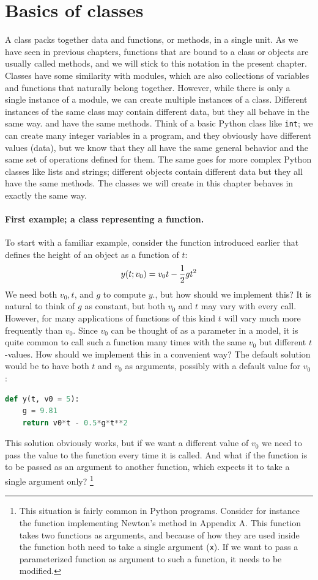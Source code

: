 \documentclass[graybox,envcountchap,sectrefs,final]{svmonodo}
\begin{document}
\section{Basics of classes}
A class packs together data and functions, or methods, in a single unit. As we have seen in previous chapters, functions
that are bound to a class or objects are usually called methods, and we will stick to this notation in the present chapter.
Classes have some similarity with modules, which are also collections of variables and functions that naturally
belong together. However, while there is only a single instance of a module, we can create multiple instances of a
class. Different instances of the same class may contain different data, but they all behave in the same way. and have the
same methods. Think of a basic Python class like \texttt{int}; we can create many integer variables in a program, and they
obviously have different values (data), but we know that they all have the same general behavior and the same
set of operations defined for them. The same goes for more complex Python classes like lists and strings; different
objects contain different data but they all have the same methods. The classes we will create in this chapter behaves
in exactly the same way.


\paragraph{First example; a class representing a function.}
To start with a familiar example, consider the function introduced earlier that defines the height of an object as a
function of $t$:
\[ y(t; v_0)=v_0t - {1\over2}gt^2\]
We need both $v_0, t$, and $g$ to compute $y$., but
how should we implement this? It is natural to think of $g$ as constant, but both $v_0$ and $t$ may vary with every call.
However, for many applications of functions of this kind $t$ will vary much more frequently than $v_0$. Since $v_0$
can be thought of as a parameter in a model, it is quite common to call such a function many times with the same $v_0$
but different $t$-values. How should we implement this in a convenient way? The default solution would be
to have both $t$ and $v_0$ as arguments, possibly with a default value for $v_0$:
\begin{lstlisting}[language=Python,style=blue1]
def y(t, v0 = 5):
    g = 9.81
    return v0*t - 0.5*g*t**2
\end{lstlisting}
This solution obviously works, but if we want a different value of $v_0$ we need to pass the value to the function every time
it is called. And what if the function is to be passed as an argument to another function, which expects it to take a
single argument only? \footnote{This situation is fairly common in Python programs. Consider for instance the function implementing Newton's method in Appendix A. This function takes two functions as arguments, and because of how they are used inside the function both need to take a single argument (\texttt{x}). If we want to pass a parameterized function as argument to such a function, it needs to be modified.}
\end{document}
